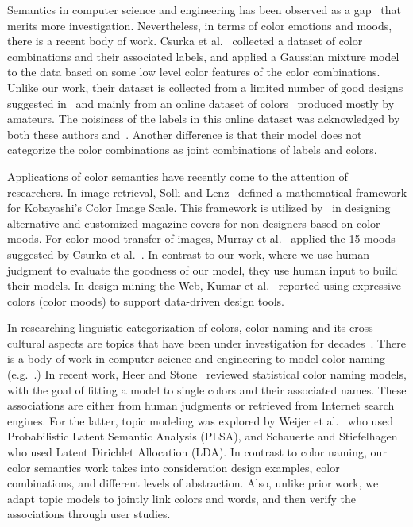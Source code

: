 \documentclass[prodmode,acmtochi]{acmsmall}
\begin{document}
Semantics in computer science and engineering has been observed as a
gap~\cite{liu2007survey,eakins1999content,sethi2001mining,mojsilovic2001capturing,zhou2000cbir,smeulders2000content,chen2003unsupervised}
that merits more investigation.  Nevertheless, in terms of color
emotions and moods, there is a recent body of work.  Csurka et
al.~\cite{csurka2010learning} collected a dataset of color combinations
and their associated labels, and applied a Gaussian mixture model to the
data based on some low level color features of the color combinations.
Unlike our work, their dataset is collected from a limited number of
good designs suggested in~\cite{eisemann2000pantone} and mainly
from an online dataset of colors~\cite{colourlovers} produced mostly by
amateurs.  The noisiness of the labels in this online dataset was
acknowledged by both these authors and~\cite{o2011color}.  Another
difference is that their model does not categorize the color
combinations as joint combinations of labels and colors.

Applications of color semantics have recently come to the attention of researchers.  In image retrieval, Solli and
Lenz~\cite{solli2010color} defined a mathematical framework for
Kobayashi's Color Image Scale.  This framework is utilized
by~\cite{jahanian2013recommendation,jahanian2013automatic} in designing
alternative and customized magazine covers for non-designers based on
color moods.  For color mood transfer of images, Murray et
al.~\cite{murray2012toward} applied the 15 moods suggested by Csurka et
al.~\cite{csurka2010learning}.
In contrast to our work, where we use human judgment to evaluate
the goodness of our model, they use human input to build their models.
In design mining the Web, Kumar et
al.~\cite{kumar2013webzeitgeist} reported using expressive colors (color
moods) to support data-driven design tools.

In researching linguistic categorization of colors, color naming and its
cross-cultural aspects are topics that have been under
investigation for decades~\cite{palmer1999vision}. There is a body of work in computer science and engineering to model color naming (e.g.~\cite{mojsilovic2005computational}.)
In recent work, Heer
and Stone~\cite{heer2012color} reviewed statistical color naming models,
with the goal of fitting a model to single colors and their associated
names.  These associations are either from human judgments or retrieved
from Internet search engines.  For the latter, topic modeling was
explored by Weijer et al.~\cite{van2009learning} who used Probabilistic
Latent Semantic Analysis (PLSA), and Schauerte and
Stiefelhagen~\cite{schauerte2012learning} who used Latent Dirichlet
Allocation (LDA).  In contrast to color naming, our color semantics work
takes into consideration design examples, color combinations, and
different levels of abstraction.  Also, unlike prior work, we adapt
topic models to jointly link colors and words, and then verify the
associations through user studies.
\end{document}
